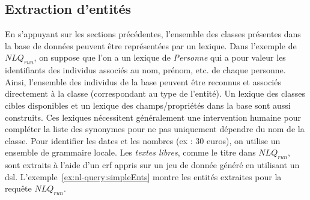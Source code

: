 \subsection{Extraction d'entités}

En s'appuyant sur les sections précédentes, l'ensemble des classes présentes dans la base de données peuvent être représentées par un lexique.
Dans l'exemple de $NLQ_{run}$, on suppose que l'on a un lexique de \emph{Personne} qui a pour valeur les identifiants des individus associés au nom, prénom, etc. de chaque personne.
Ainsi, l'ensemble des individus de la base peuvent être reconnus et associés directement à la classe (correspondant au type de l'entité).
Un lexique des classes cibles disponibles et un lexique des champs/propriétés dans la base sont aussi construits.
Ces lexiques nécessitent généralement une intervention humaine pour compléter la liste des synonymes pour ne pas uniquement dépendre du nom de la classe.
Pour identifier les dates et les nombres (ex : 30 euros), on utilise un ensemble de grammaire locale.
Les \emph{textes libres}, comme le titre dans $NLQ_{run}$, sont extraits à l'aide d'un \gls{crf} appris sur un jeu de donnée généré en utilisant un \gls{dsl}.
L'exemple~\ref{ex:nl-query:simpleEnts} montre les entités extraites pour la requête $NLQ_{run}$.

